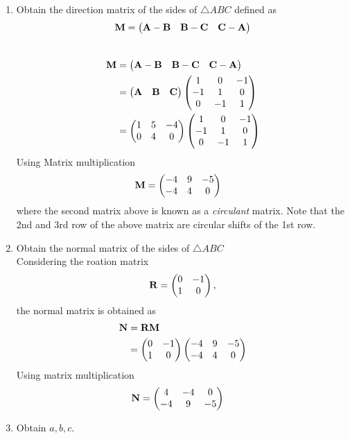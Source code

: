 \documentclass[11pt]{book}
\begin{document}
\begin{enumerate}[label=\thesubsection.\arabic*.,ref=\thesubsection.\theenumi]
\item Obtain the direction matrix of the sides of $\triangle ABC$ defined as 
\begin{align}
\mathbf{M} = 	\begin{pmatrix}\mathbf{A}-\mathbf{B} & \mathbf{B}-\mathbf{C} & \mathbf{C}-\mathbf{A}\end{pmatrix}
\end{align}
\\
\solution 
\begin{align}
\mathbf{M} &= \begin{pmatrix}\mathbf{A}-\mathbf{B} & \mathbf{B}-\mathbf{C} & \mathbf{C}-\mathbf{A}\end{pmatrix} \\
	&= \begin{pmatrix}\mathbf{A} & \mathbf{B} &\mathbf{C}\end{pmatrix} \begin{pmatrix}1 & 0 & -1 \\ -1 & 1 & 0 \\ 0 & -1 & 1\end{pmatrix} \\
 &=\begin{pmatrix}1 & 5 & -4 \\ 0 & 4 & 0\end{pmatrix}\begin{pmatrix}1 & 0 & -1 \\ -1 & 1 & 0 \\ 0 & -1 & 1\end{pmatrix} 
 \end{align}
 Using Matrix multiplication
 \begin{align}
 \mathbf{M} &=\begin{pmatrix}-4 & 9 & -5 \\ -4 & 4 & 0\end{pmatrix}
\end{align}
where the second matrix above is known as a {\em circulant} matrix.  Note that the 2nd and 3rd row of the above matrix are circular shifts of the 1st row.
\item Obtain the normal matrix  of the sides of $\triangle ABC$ \\
\solution Considering the roation matrix
\begin{align}
\mathbf{R}  = \begin{pmatrix}0 & -1 \\ 1 & 0\end{pmatrix},
\end{align}
the normal matrix is obtained as
\begin{align}
\mathbf{N} &= \mathbf{R}\mathbf{M}  \\
&=\begin{pmatrix}0 & -1 \\ 1 & 0\end{pmatrix}\begin{pmatrix}-4 & 9 & -5 \\ -4 & 4 & 0\end{pmatrix}
\end{align}
Using matrix multiplication 
\begin{align}
   \mathbf{N} &= \begin{pmatrix}4 & -4 & 0 \\ -4 & 9 & -5\end{pmatrix}
\end{align}
\item Obtain $a, b, c$. \\

\end{enumerate}
\end{document}
